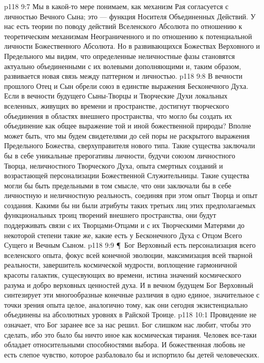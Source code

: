 \vs p118 9:7 Мы в какой\hyp{}то мере понимаем, как механизм Рая согласуется с личностью Вечного Сына; это --- функция Носителя Объединенных Действий. У нас есть теории по поводу действий Вселенского Абсолюта по отношению к теоретическим механизмам Неограниченного и по отношению к потенциальной личности Божественного Абсолюта. Но в развивающихся Божествах Верховного и Предельного мы видим, что определенные неличностные фазы становятся актуально объединенными с их волевыми дополняющими и, таким образом, развивается новая связь между паттерном и личностью.
\vs p118 9:8 В вечности прошлого Отец и Сын обрели союз в единстве выражения Бесконечного Духа. Если в вечности будущего Сыны\hyp{}Творцы и Творческие Духи локальных вселенных, живущих во времени и пространстве, достигнут творческого объединения в областях внешнего пространства, что могло бы создать их объединение как общее выражение той и иной божественной природы? Вполне может быть, что мы будем свидетелями до сей поры не раскрытого выражения Предельного Божества, сверхуправителя нового типа. Такие существа заключали бы в себе уникальные прерогативы личности, будучи союзом личностного Творца, неличностного Творческого Духа, опыта смертных созданий и возрастающей персонализации Божественной Служительницы. Такие существа могли бы быть предельными в том смысле, что они заключали бы в себе личностную и неличностную реальность, соединяя при этом опыт Творца и опыт создания. Какими бы ни были атрибуты таких третьих лиц этих предполагаемых функциональных троиц творений внешнего пространства, они будут поддерживать связи с их Творцами\hyp{}Отцами и с их Творческими Матерями до некоторой степени такие же, какие есть у Бесконечного Духа с Отцом Всего Сущего и Вечным Сыном.
\vs p118 9:9 \P\ Бог Верховный есть персонализация всего вселенского опыта, фокус всей конечной эволюции, максимизация всей тварной реальности, завершитель космической мудрости, воплощение гармоничной красоты галактик, сущесвующих во времени, истина значений космического разума и добро верховных ценностей духа. И в вечном будущем Бог Верховный синтезирует эти многообразные конечные различия в одно единое, значительное с точки зрения опыта целое, аналогично тому, как они сегодня экзистенциально объединены на абсолютных уровнях в Райской Троице.
\vs p118 10:1 Провидение не означает, что Бог заранее все за нас решил. Бог слишком нас любит, чтобы это сделать, ибо это было бы ничто иное как космическая тирания. Человек все\hyp{}таки обладает относительными способностями выбора. И божественная любовь не есть слепое чувство, которое разбаловало бы и испортило бы детей человеческих.
